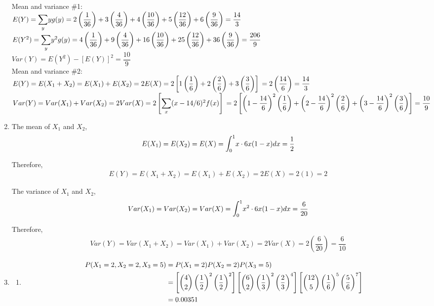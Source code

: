 \documentclass{article}
\newcommand\mfrac[2]{\left(\dfrac{#1}{#2}\right)}
\newcommand\lint{\mathlarger{\int}}
\newcommand\lsum{\mathlarger{\sum}}
\newcommand\myskip[1]{\addtocounter{enumi}{#1}}
\begin{document}
\begin{enumerate}
      Mean and variance \#1:\\
      $E(Y) = \lsum_y {y g(y)} = 2\mfrac{1}{36} + 3\mfrac{4}{36} + 4\mfrac{10}{36} + 5\mfrac{12}{36}
      + 6\mfrac{9}{36} = \dfrac{14}{3}$ \\
      $E(Y^2) = \lsum_y {y^2 g(y)} = 4\mfrac{1}{36} + 9\mfrac{4}{36} + 16\mfrac{10}{36} + 25\mfrac{12}{36}
      + 36\mfrac{9}{36} = \dfrac{206}{9}$ \\
      $Var(Y) = E(Y^2) - [E(Y)]^2 = \dfrac{10}{9}$ \\
      
      Mean and variance \#2: \\
      $E(Y) = E(X_1 + X_2) = E(X_1) + E(X_2) = 2E(X)
	= 2\left[1\mfrac{1}{6} + 2\mfrac{2}{6} + 3\mfrac{3}{6}\right] \\ 
	= 2\mfrac{14}{6} = \dfrac{14}{3}$ \\
      $Var(Y) = Var(X_1) + Var(X_2) = 2Var(X) = 2\left[\lsum_x{(x-14/6)^2 f(x)}\right] \\
	= 2\left[\left(1-\dfrac{14}{6}\right)^2\mfrac{1}{6} 
	  + \left(2 - \dfrac{14}{6}\right)^2\mfrac{2}{6}
	  + \left(3 - \dfrac{14}{6}\right)^2\mfrac{3}{6}\right] = \dfrac{10}{9}$
     
     \item
      The mean of $X_1$ and $X_2$,
      \begin{align*}
       E(X_1) = E(X_2) = E(X) = \lint_0^1{x \cdot 6x(1-x) dx} = \dfrac{1}{2}
      \end{align*}
      
      Therefore,
      \begin{align*}
       E(Y) = E(X_1 + X_2) = E(X_1) + E(X_2) = 2E(X) = 2(1) = 2
      \end{align*}

      The variance of $X_1$ and $X_2$,
      \begin{align*}
       Var(X_1) = Var(X_2) = Var(X) = \lint_0^1{x^2 \cdot 6x(1-x) dx} = \dfrac{6}{20}
      \end{align*}

      Therefore,
      \begin{align*}
       Var(Y) = Var(X_1 + X_2) = Var(X_1) + Var(X_2) = 2Var(X) = 2\mfrac{6}{20} = \dfrac{6}{10}
      \end{align*}
     \myskip{4}
     
     \item
      \begin{enumerate}
       \item 	
	\begin{align*}
	  P(X_1=2, X_2=2, X_3=5) &= P(X_1 = 2)P(X_2 = 2)P(X_3 = 5) \\
	    &= \left[\dbinom{4}{2}\mfrac{1}{2}^2\mfrac{1}{2}^2\right]
	      \left[\dbinom{6}{2}\mfrac{1}{3}^2\mfrac{2}{3}^4\right]
	      \left[\dbinom{12}{5}\mfrac{1}{6}^5\mfrac{5}{6}^7\right] \\
	    &= 0.00351
	\end{align*}
       

\end{enumerate}
\end{enumerate}
\end{document}
